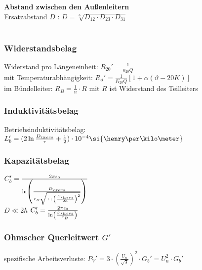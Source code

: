 \documentclass[fs, footer]{latex4ei}
\begin{document}
\begin{multicols*}{4}
{\textbf{Abstand zwischen den Außenleitern} \\ 
Ersatzabstand $D$ : $D = \sqrt[3]{D_{12} \cdot D_{23} \cdot D_{31}}$ \\ \\


\subsubsection{Widerstandsbelag}


Widerstand pro Längeneinheit: $R_{20}' =  \frac{1}{\kappa_{20} Q}$ \\
mit Temperaturabhängigkeit: $R_{\vartheta}'= \frac{1}{K_{20} Q} \left[ 1+ \alpha ( \vartheta - 20 K) \right]$\\ 

im Bündelleiter: $R_B = \frac{1}{n} \cdot R$ mit $R$ ist Widerstand des Teilleiters

\subsubsection{Induktivitätsbelag}
Betriebsinduktivitätsbelag: $L_b' = (2 \ln \frac{D_{\ir ers}}{r} + \frac 1 2 ) \cdot 10^{-4} \si{\henry \per \kilo \meter}$ \\


\subsubsection{Kapazitätsbelag}
 $C_b ' = \frac{2 \pi \epsilon_0}{\ln \left( \frac{D_{\ir ers}}{r_B \sqrt{1 + \left( \frac{D_{\ir ers}}{2 h}\right)^2 } }\right)} $ \\ 


$D \ll 2h$ $C_b' = \frac{2 \pi \epsilon_0}{\ln \left( \frac{D_{\ir ers}}{ r_B} \right) }$ \\ 


\subsubsection{Ohmscher Querleitwert $G'$}

spezifische Arbeitsverluste: $P_V' = 3 \cdot \left( \frac{U_n}{\sqrt{3}} \right)^2 \cdot G_b' = U_n^2 \cdot G_b'$ \\

}
\end{multicols*}
\end{document}
